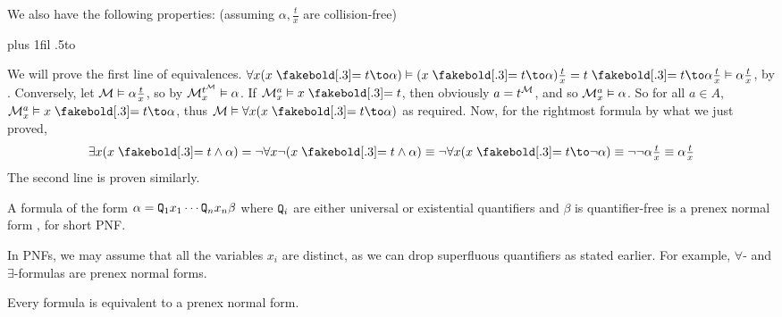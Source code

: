 We also have the following properties: (assuming $\alpha,\frac tx$ are collision-free)

\medskip
\tabskip=0pt plus 1fil
{\openup.5\jot\halign to}
\medskip

We will prove the first line of equivalences.
$\forall x(x\eq t\to\alpha)\vDash(x\eq t\to\alpha)\tfrac tx=t\eq t\to\alpha\tfrac tx\vDash\alpha\tfrac tx$, by .
Conversely, let ${\cal M}\vDash\alpha\tfrac tx$, so by  ${\cal M}^{t^{\cal M}}_x\vDash\alpha$.
If ${\cal M}^a_x\vDash x\eq t$, then obviously $a=t^{\cal M}$, and so ${\cal M}^a_x\vDash\alpha$.
So for all $a\in A$, ${\cal M}^a_x\vDash x\eq t\to\alpha$, thus ${\cal M}\vDash\forall x(x\eq t\to\alpha)$ as required.
Now, for the rightmost formula by what we just proved,
$$ \exists x(x\eq t\land\alpha) = \neg\forall x\neg(x\eq t\land\alpha) \equiv \neg\forall x(x\eq t\to\neg\alpha) \equiv \neg\neg\alpha\tfrac tx\equiv \alpha\tfrac tx $$
The second line is proven similarly.

\bdefn

    A formula of the form $\alpha={\tt Q}_1x_1\cdots{\tt Q}_nx_n\beta$ where ${\tt Q}_i$ are either universal or existential quantifiers and $\beta$ is quantifier-free is a {\emphcolor prenex normal form}%
    , for short PNF.

\edefn

In PNFs, we may assume that all the variables $x_i$ are distinct, as we can drop superfluous quantifiers as stated earlier.
For example, $\forall$- and $\exists$-formulas are prenex normal forms.

\bthrm[name=pnftheorem]

    Every formula is equivalent to a prenex normal form.

\ethrm

